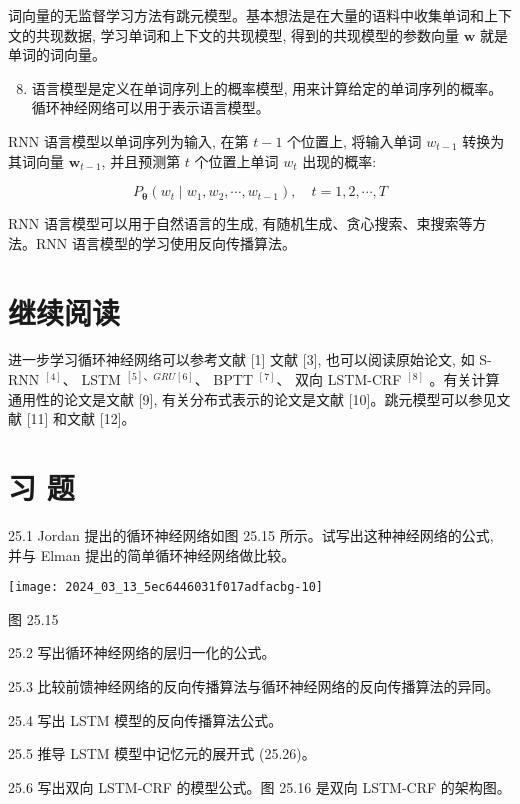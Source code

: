 \documentclass[10pt]{article}
\begin{document}
词向量的无监督学习方法有跳元模型。基本想法是在大量的语料中收集单词和上下文的共现数据, 学习单词和上下文的共现模型, 得到的共现模型的参数向量 $\boldsymbol{w}$ 就是单词的词向量。

\begin{enumerate}
  \setcounter{enumi}{7}
  \item 语言模型是定义在单词序列上的概率模型, 用来计算给定的单词序列的概率。循环神经网络可以用于表示语言模型。
\end{enumerate}

RNN 语言模型以单词序列为输入, 在第 $t-1$ 个位置上, 将输入单词 $w_{t-1}$ 转换为其词向量 $\boldsymbol{w}_{t-1}$, 并且预测第 $t$ 个位置上单词 $w_{t}$ 出现的概率:

$$
P_{\boldsymbol{\theta}}\left(w_{t} \mid w_{1}, w_{2}, \cdots, w_{t-1}\right), \quad t=1,2, \cdots, T
$$

RNN 语言模型可以用于自然语言的生成, 有随机生成、贪心搜索、束搜索等方法。RNN 语言模型的学习使用反向传播算法。

\section*{继续阅读}
进一步学习循环神经网络可以参考文献 [1] 文献 [3], 也可以阅读原始论文, 如 S-RNN ${ }^{[4]} 、$ LSTM $^{[5] 、 G R U}{ }^{[6]} 、$ BPTT ${ }^{[7]} 、$ 双向 LSTM-CRF ${ }^{[8]}$ 。有关计算通用性的论文是文献 [9], 有关分布式表示的论文是文献 [10]。跳元模型可以参见文献 [11] 和文献 [12]。

\section*{习 题}
25.1 Jordan 提出的循环神经网络如图 25.15 所示。试写出这种神经网络的公式, 并与 Elman 提出的简单循环神经网络做比较。

\begin{center}
\texttt{[image: 2024\_03\_13\_5ec6446031f017adfacbg-10]}
\end{center}

图 25.15

25.2 写出循环神经网络的层归一化的公式。

25.3 比较前馈神经网络的反向传播算法与循环神经网络的反向传播算法的异同。

25.4 写出 LSTM 模型的反向传播算法公式。

25.5 推导 LSTM 模型中记忆元的展开式 (25.26)。

25.6 写出双向 LSTM-CRF 的模型公式。图 25.16 是双向 LSTM-CRF 的架构图。
\end{document}
